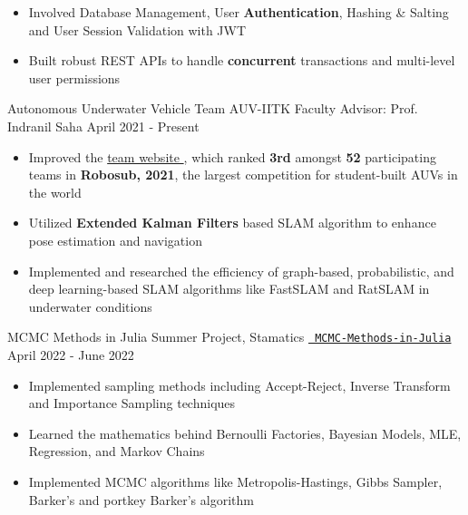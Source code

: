 \begin{cventries}
{\begin{itemize}
      \item Involved Database Management, User \textbf{Authentication}, Hashing \& Salting and User Session Validation with JWT
      \item Built robust REST APIs to handle \textbf{concurrent} transactions and multi-level user permissions
    \end{itemize}
  }
\cventry
{Autonomous Underwater Vehicle} %
{Team AUV-IITK} %
{Faculty Advisor: Prof. Indranil Saha} %
{April 2021 - Present} %
{
  \begin{itemize} %
    \item {Improved the \href{https://auv.sntiitk.in/}{team website {\small \faExternalLink{}}}, which ranked \textbf{3rd} amongst \textbf{52} participating teams in \textbf{Robosub, 2021}}, the largest competition for student-built AUVs in the world
    \item Utilized \textbf{Extended Kalman Filters} based SLAM algorithm to enhance pose estimation and navigation
    \item Implemented and researched the efficiency of graph-based, probabilistic, and deep learning-based SLAM algorithms like FastSLAM and RatSLAM in underwater conditions
  \end{itemize}
}
  \cventry
  {MCMC Methods in Julia}
  {Summer Project, Stamatics}
  {\texttt{\href{https://github.com/abhishekshree/mcmc-methods-in-julia}{\faGithub{} MCMC-Methods-in-Julia}}}
  {April 2022 - June 2022}
  {
    \begin{itemize}
      \item Implemented sampling methods including Accept-Reject, Inverse Transform and Importance Sampling techniques
      \item Learned the mathematics behind Bernoulli Factories, Bayesian Models, MLE, Regression, and Markov Chains
      \item Implemented MCMC algorithms like Metropolis-Hastings, Gibbs Sampler, Barker's and portkey Barker’s algorithm
    \end{itemize}
  }

\end{cventries}

